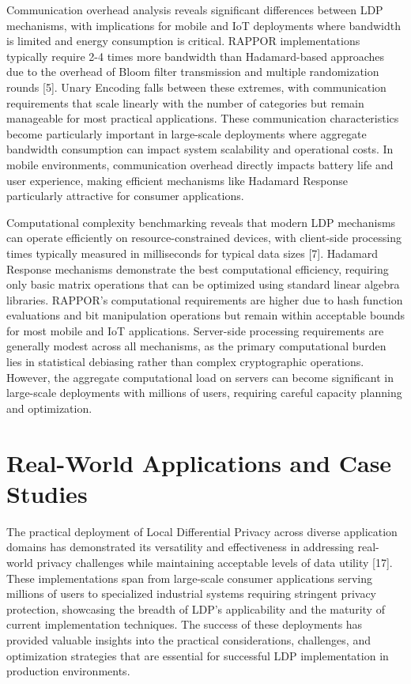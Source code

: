 \documentclass[conference]{IEEEtran}
\begin{document}
Communication overhead analysis reveals significant differences between LDP mechanisms, with implications for mobile and IoT deployments where bandwidth is limited and energy consumption is critical. RAPPOR implementations typically require 2-4 times more bandwidth than Hadamard-based approaches due to the overhead of Bloom filter transmission and multiple randomization rounds [5]. Unary Encoding falls between these extremes, with communication requirements that scale linearly with the number of categories but remain manageable for most practical applications. These communication characteristics become particularly important in large-scale deployments where aggregate bandwidth consumption can impact system scalability and operational costs. In mobile environments, communication overhead directly impacts battery life and user experience, making efficient mechanisms like Hadamard Response particularly attractive for consumer applications.

Computational complexity benchmarking reveals that modern LDP mechanisms can operate efficiently on resource-constrained devices, with client-side processing times typically measured in milliseconds for typical data sizes [7]. Hadamard Response mechanisms demonstrate the best computational efficiency, requiring only basic matrix operations that can be optimized using standard linear algebra libraries. RAPPOR's computational requirements are higher due to hash function evaluations and bit manipulation operations but remain within acceptable bounds for most mobile and IoT applications. Server-side processing requirements are generally modest across all mechanisms, as the primary computational burden lies in statistical debiasing rather than complex cryptographic operations. However, the aggregate computational load on servers can become significant in large-scale deployments with millions of users, requiring careful capacity planning and optimization.

\section{Real-World Applications and Case Studies}

The practical deployment of Local Differential Privacy across diverse application domains has demonstrated its versatility and effectiveness in addressing real-world privacy challenges while maintaining acceptable levels of data utility [17]. These implementations span from large-scale consumer applications serving millions of users to specialized industrial systems requiring stringent privacy protection, showcasing the breadth of LDP's applicability and the maturity of current implementation techniques. The success of these deployments has provided valuable insights into the practical considerations, challenges, and optimization strategies that are essential for successful LDP implementation in production environments.
\end{document}
